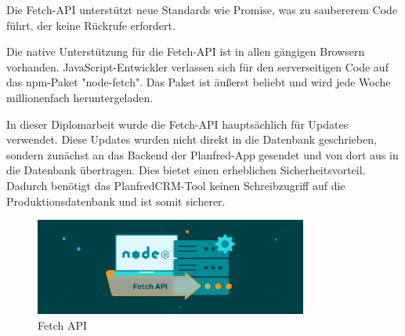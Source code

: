 Die Fetch-API unterstützt neue Standards wie Promise, was zu saubererem Code führt, der keine Rückrufe erfordert.

Die native Unterstützung für die Fetch-API ist in allen gängigen Browsern vorhanden. JavaScript-Entwickler verlassen sich für den serverseitigen Code auf das npm-Paket "node-fetch". Das Paket ist äußerst beliebt und wird jede Woche millionenfach heruntergeladen.

In dieser Diplomarbeit wurde die Fetch-API hauptsächlich für Updates verwendet. Diese Updates wurden nicht direkt in die Datenbank geschrieben, sondern zunächst an das Backend der Planfred-App gesendet und von dort aus in die Datenbank übertragen. Dies bietet einen erheblichen Sicherheitsvorteil. Dadurch benötigt das PlanfredCRM-Tool keinen Schreibzugriff auf die Produktionsdatenbank und ist somit sicherer.

\begin{figure}[h]
    \centering
    \includegraphics[width=0.8\textwidth]{pics/fetch-api.png}
    \caption{Fetch API}
\end{figure}



\cite{Fetch_API}
